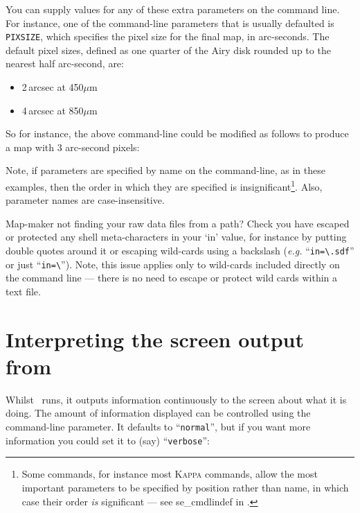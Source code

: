 You can supply values for any of these extra parameters on the command
line. For instance, one of the command-line parameters that is usually
defaulted is \texttt{PIXSIZE}, which specifies the pixel size for the final
map, in arc-seconds. The default pixel sizes, defined as one quarter of the
Airy disk rounded up to the nearest half arc-second, are:

\begin{itemize}
\item 2\,arcsec at 450$\mu$m
\item 4\,arcsec at 850$\mu$m
\end{itemize}

So for instance, the above command-line could be modified as follows to
produce a map with 3 arc-second pixels:


Note, if parameters are specified by name on the command-line, as
in these examples, then the order in which they are specified is
insignificant\footnote{Some commands, for instance most \textsc{Kappa}
commands, allow the most important parameters to be specified by position
rather than name, in which case their order \emph{is} significant ---
see 
{se_cmdlindef} in .}. Also, parameter names are
case-insensitive.

\begin{tip}
  Map-maker not finding your raw data files from a path? Check you have
  escaped or protected any shell meta-characters in your `in' value,
  for instance by putting double quotes around it or escaping
  wild-cards using a backslash (\emph{e.g.} ``\texttt{in=\textbackslash*.sdf}''
  or just ``\texttt{in=\textbackslash*}''). Note, this issue applies only to
  wild-cards included directly on the command line --- there is no need to
  escape or protect wild cards within a text file.
\end{tip}

\section{Interpreting the screen output from }

Whilst \makemap\ runs, it outputs information continuously to the screen
about what it is doing. The amount of information displayed can be
controlled using the  command-line
parameter. It defaults to ``\texttt{normal}'', but if you want more
information you could set it to (say) ``\texttt{verbose}'':

